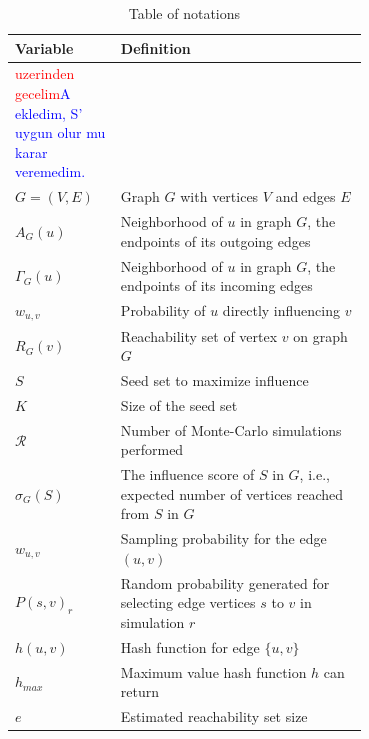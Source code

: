 \documentclass[10pt,journal,compsoc]{IEEEtran}
\newcommand\ggx[1]{\textcolor{blue}{#1}}
\newcommand\kktodo[1]{\textcolor{red}{#1}}
\begin{document}
\begin{table}[!ht]
    \caption{Table of notations}
    \label{tab:notation}
    \centering
    \begin{tabular}{|l|p{0.7\linewidth}|}
        \hline
        Variable & Definition  \\
        \hline
        \kktodo{uzerinden 
        gecelim}\ggx{A ekledim, S' uygun olur mu karar veremedim.}\\
        $G = (V,E)$     & Graph $G$ with vertices $V$ and edges $E$ \\
        $A_G(u)$   & Neighborhood of $u$ in graph $G$, the endpoints of its outgoing edges\\ %
        $\Gamma_G(u)$   & Neighborhood of $u$ in graph $G$, the endpoints of its incoming edges\\ %
        $w_{u,v}$       & Probability of $u$ directly influencing $v$ \\
        $R_{G}(v)$      & Reachability set of vertex $v$ on graph $G$\\
        \hline\hline
        $S$             & Seed set to maximize influence\\
        $K$             & Size of the seed set\\
        $\mathcal{R}$   & Number of Monte-Carlo simulations performed\\
        $\sigma_{G}(S)$ & The influence score of $S$ in $G$, i.e., expected number of vertices reached from $S$ in $G$\\
        \hline\hline
        $w_{u,v}$             & Sampling probability for the edge $(u,v)$\\
        $P(s,v)_r $     & Random probability generated for selecting edge vertices $s$ to $v$ in simulation $r$\\
        $h(u,v)$        & Hash function for edge $\{u,v\}$\\
        $h_{max}$       & Maximum value hash function $h$ can return\\
        \hline\hline
        $e$             & Estimated reachability set size\\

\end{tabular}
\end{table}
\end{document}
